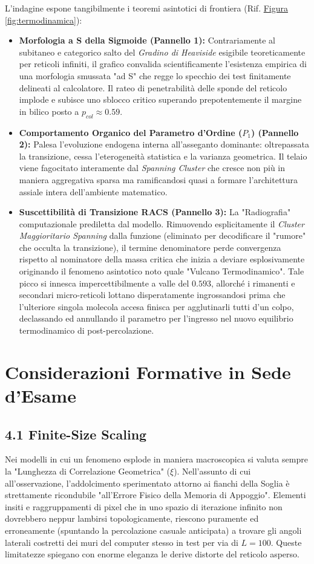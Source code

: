 \documentclass[11pt,a4paper]{article}
\begin{document}
L'indagine espone tangibilmente i teoremi asintotici di frontiera (Rif. \hyperref[fig:termodinamica]{Figura \ref*{fig:termodinamica}}):
\begin{itemize}
    \item \textbf{Morfologia a S della Sigmoide (Pannello 1):} Contrariamente al subitaneo e categorico salto del \textit{Gradino di Heaviside} esigibile teoreticamente per reticoli infiniti, il grafico convalida scientificamente l'esistenza empirica di una morfologia smussata "ad S" che regge lo specchio dei test finitamente delineati al calcolatore. Il rateo di penetrabilità delle sponde del reticolo implode e subisce uno sblocco critico superando prepotentemente il margine in bilico posto a $p_{col} \approx 0.59$.
    \item \textbf{Comportamento Organico del Parametro d'Ordine ($P_1$) (Pannello 2):} Palesa l'evoluzione endogena interna all'asseganto dominante: oltrepassata la transizione, cessa l'eterogeneità statistica e la varianza geometrica. Il telaio viene fagocitato interamente dal \textit{Spanning Cluster} che cresce non più in maniera aggregativa sparsa ma ramificandosi quasi a formare l'architettura assiale intera dell'ambiente matematico.
    \item \textbf{Suscettibilità di Transizione RACS (Pannello 3):} La "Radiografia" computazionale prediletta dal modello. Rimuovendo esplicitamente il \textit{Cluster Maggioritario Spanning} dalla funzione (eliminato per decodificare il "rumore" che occulta la transizione), il termine denominatore perde convergenza rispetto al nominatore della massa critica che inizia a deviare esplosivamente originando il fenomeno asintotico noto quale "Vulcano Termodinamico". Tale picco si innesca impercettibilmente a valle del $0.593$, allorché i rimanenti e secondari micro-reticoli lottano disperatamente ingrossandosi prima che l'ulteriore singola molecola accesa finisca per agglutinarli tutti d'un colpo, declassando ed annullando il parametro per l'ingresso nel nuovo equilibrio termodinamico di post-percolazione.
\end{itemize}

\section{Considerazioni Formative in Sede d'Esame}
\subsection*{4.1 Finite-Size Scaling}
Nei modelli in cui un fenomeno esplode in maniera macroscopica si valuta sempre la "Lunghezza di Correlazione Geometrica" ($\xi$). Nell'assunto di cui all'osservazione, l'addolcimento sperimentato attorno ai fianchi della Soglia è strettamente ricondubile "all'Errore Fisico della Memoria di Appoggio". Elementi insiti e raggruppamenti di pixel che in uno spazio di iterazione infinito non dovrebbero neppur lambirsi topologicamente, riescono puramente ed erroneamente (spuntando la percolazione casuale anticipata) a trovare gli angoli laterali costretti dei muri del computer stesso in test per via di $L=100$. Queste limitatezze spiegano con enorme eleganza le derive distorte del reticolo asperso.
\end{document}
